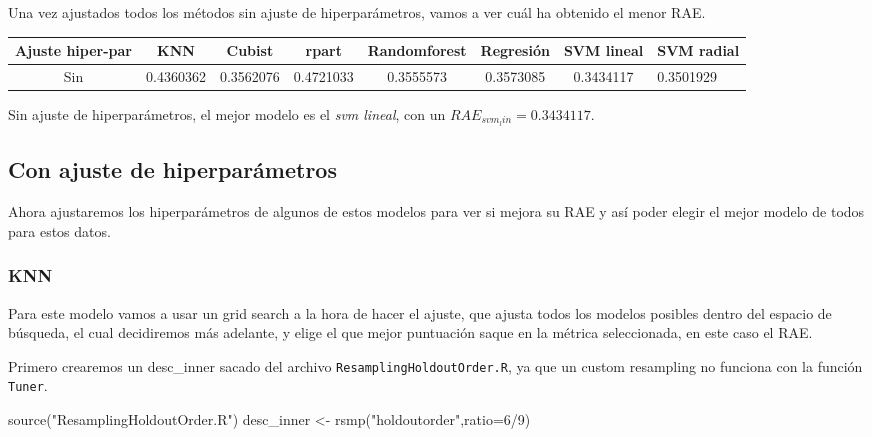 \documentclass[
  11pt,
  a4paper,
]{article}
\newenvironment{Shaded}{\begin{snugshade}}{\end{snugshade}}
\newcommand{\AttributeTok}[1]{\textcolor[rgb]{0.77,0.63,0.00}{#1}}
\newcommand{\DecValTok}[1]{\textcolor[rgb]{0.00,0.00,0.81}{#1}}
\newcommand{\FunctionTok}[1]{\textcolor[rgb]{0.00,0.00,0.00}{#1}}
\newcommand{\NormalTok}[1]{#1}
\newcommand{\OtherTok}[1]{\textcolor[rgb]{0.56,0.35,0.01}{#1}}
\newcommand{\SpecialCharTok}[1]{\textcolor[rgb]{0.00,0.00,0.00}{#1}}
\newcommand{\StringTok}[1]{\textcolor[rgb]{0.31,0.60,0.02}{#1}}
\begin{document}
Una vez ajustados todos los métodos sin ajuste de hiperparámetros, vamos
a ver cuál ha obtenido el menor RAE.

\begin{center}
\begin{tabular}{ |c|c|c|c|c|c|c| } 
\hline
\textbf{Ajuste hiper-par}           & \textbf{KNN}          & \textbf{Cubist}      &\textbf{rpart}      &\textbf{Randomforest}      &\textbf{Regresión}      &\textbf{SVM lineal}      &\textbf{SVM radial} \\
 \hline \hline 
 Sin & 0.4360362 & 0.3562076 & 0.4721033 & 0.3555573 & 0.3573085 & 0.3434117 & 0.3501929 
 \\
 \hline
\end{tabular}
\end{center}

Sin ajuste de hiperparámetros, el mejor modelo es el \emph{svm lineal},
con un \(RAE_{svm_lin} = 0.3434117\).

\subsection{Con ajuste de hiperparámetros}

Ahora ajustaremos los hiperparámetros de algunos de estos modelos para
ver si mejora su RAE y así poder elegir el mejor modelo de todos para
estos datos.

\subsubsection{KNN}

Para este modelo vamos a usar un grid search a la hora de hacer el
ajuste, que ajusta todos los modelos posibles dentro del espacio de
búsqueda, el cual decidiremos más adelante, y elige el que mejor
puntuación saque en la métrica seleccionada, en este caso el RAE.

Primero crearemos un desc\_inner sacado del archivo
\texttt{ResamplingHoldoutOrder.R}, ya que un custom resampling no
funciona con la función \texttt{Tuner}.

\begin{Shaded}
\begin{Highlighting}[]
\FunctionTok{source}\NormalTok{(}\StringTok{"ResamplingHoldoutOrder.R"}\NormalTok{)}
\NormalTok{desc\_inner }\OtherTok{\textless{}{-}} \FunctionTok{rsmp}\NormalTok{(}\StringTok{"holdoutorder"}\NormalTok{,}\AttributeTok{ratio=}\DecValTok{6}\SpecialCharTok{/}\DecValTok{9}\NormalTok{)}
\end{Highlighting}
\end{Shaded}
\end{document}
